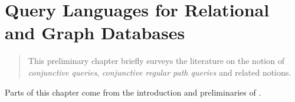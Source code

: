 \chapter{Query Languages for Relational and Graph Databases}
\label{ch:prelim-graph-databases}
\renewcommand\thefigure{\thechapter.\arabic{figure}}

\begin{chapterpresentation}
	\begin{abstract}
		This preliminary chapter briefly surveys the literature on
		the notion of \emph{conjunctive queries},
		\emph{conjunctive regular path queries} and related notions.

	\end{abstract}
	\par\bigskip\bigskip
	\begin{acknowledgements}
		Parts of this chapter come from the introduction and preliminaries of \cite{FigueiraMorvan2025SemanticTreeWidthLMCS,FigueiraMorvanRomero2025Minimizing}.
	\end{acknowledgements}
	\clearpagepresentation
	\chaptertocstandalone
\end{chapterpresentation}


